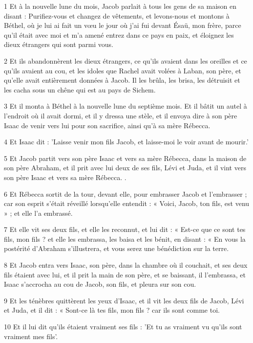 \par 1 Et à la nouvelle lune du mois, Jacob parlait à tous les gens de sa maison en disant : Purifiez-vous et changez de vêtements, et levons-nous et montons à Béthel, où je lui ai fait un vœu le jour où j'ai fui devant Ésaü, mon frère, parce qu'il était avec moi et m'a amené entrez dans ce pays en paix, et éloignez les dieux étrangers qui sont parmi vous.
\par 2 Et ils abandonnèrent les dieux étrangers, ce qu'ils avaient dans les oreilles et ce qu'ils avaient au cou, et les idoles que Rachel avait volées à Laban, son père, et qu'elle avait entièrement données à Jacob. Il les brûla, les brisa, les détruisit et les cacha sous un chêne qui est au pays de Sichem.
\par 3 Et il monta à Béthel à la nouvelle lune du septième mois. Et il bâtit un autel à l'endroit où il avait dormi, et il y dressa une stèle, et il envoya dire à son père Isaac de venir vers lui pour son sacrifice, ainsi qu'à sa mère Rébecca.
\par 4 Et Isaac dit : 'Laisse venir mon fils Jacob, et laisse-moi le voir avant de mourir.'
\par 5 Et Jacob partit vers son père Isaac et vers sa mère Rébecca, dans la maison de son père Abraham, et il prit avec lui deux de ses fils, Lévi et Juda, et il vint vers son père Isaac et vers sa mère Rébecca. .
\par 6 Et Rébecca sortit de la tour, devant elle, pour embrasser Jacob et l'embrasser ; car son esprit s'était réveillé lorsqu'elle entendit : « Voici, Jacob, ton fils, est venu » ; et elle l'a embrassé.
\par 7 Et elle vit ses deux fils, et elle les reconnut, et lui dit : « Est-ce que ce sont tes fils, mon fils ? et elle les embrassa, les baisa et les bénit, en disant : « En vous la postérité d'Abraham s'illustrera, et vous serez une bénédiction sur la terre.
\par 8 Et Jacob entra vers Isaac, son père, dans la chambre où il couchait, et ses deux fils étaient avec lui, et il prit la main de son père, et se baissant, il l'embrassa, et Isaac s'accrocha au cou de Jacob, son fils, et pleura sur son cou.
\par 9 Et les ténèbres quittèrent les yeux d'Isaac, et il vit les deux fils de Jacob, Lévi et Juda, et il dit : « Sont-ce là tes fils, mon fils ? car ils sont comme toi.
\par 10 Et il lui dit qu'ils étaient vraiment ses fils : 'Et tu as vraiment vu qu'ils sont vraiment mes fils'.
